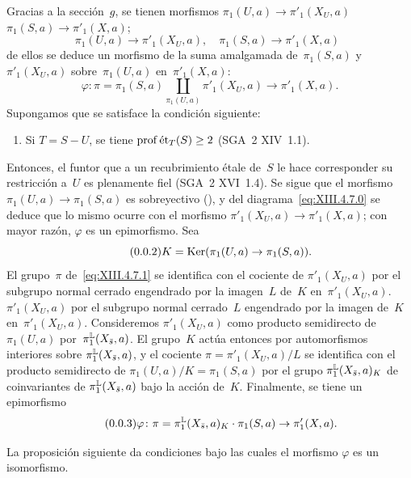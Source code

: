 Gracias a la sección~$g$, se tienen morfismos
{$\pi_1(U,a)\to\pi'_1(X_U,a)$ $\pi_1(S,a)\to\pi'_1(X,a)$;}
{$$\pi_1(U,a)\to\pi'_1(X_U,a),\quad \pi_1(S,a)\to\pi'_1(X,a)\,\;$$}
de ellos se deduce un morfismo de la suma amalgamada de~$\pi_1(S,a)$ y
$\pi'_1(X_U,a)$ sobre~$\pi_1(U,a)$ en~$\pi'_1(X,a)$:
\begin{equation*}
\label{eq:XIII.4.7.1} \tag{\thesubsection.1} {}
\varphi\colon\pi=\pi_1(S,a)\coprod_{\pi_1(U,a)}\pi'_1(X_U,a)\to\pi'_1(X,a).
\end{equation*}
Supongamos que se satisface la condición siguiente:
\begin{enumerate}
\item[c)] Si $T=S-U$, se tiene $\operatorname{prof} \mathrm{\acute{e}t}_T(S)\geq 2$ (SGA~2 XIV~1.1).
\end{enumerate}
Entonces, el funtor que a un recubrimiento étale de~$S$ le hace
corresponder su restricción a~$U$ es plenamente fiel (SGA~2 XVI~1.4).
Se sigue que el morfismo $\pi_1(U,a)\to\pi_1(S,a)$ es sobreyectivo
(), y del
diagrama~\eqref{eq:XIII.4.7.0} se deduce que lo mismo ocurre con el
morfismo $\pi'_1(X_U,a)\to\pi'_1(X,a)$; con mayor razón, $\varphi$ es un
epimorfismo. Sea
\begin{equation*}
\label{eq:XIII.4.7.2} \tag{\thesubsection.2} {}
K=\Ker(\pi_1(U,a)\to\pi_1(S,a)).
\end{equation*}
El grupo~$\pi$ de~\eqref{eq:XIII.4.7.1} se identifica con el cociente de
{$\pi'_1(X_U,a)$ por el subgrupo normal cerrado engendrado por la imagen~$L$
de~$K$ en~$\pi'_1(X_U,a)$.}
{$\pi'_1(X_U,a)$ por el subgrupo normal cerrado~$L$ engendrado por la imagen
de~$K$ en~$\pi'_1(X_U,a)$.}
Consideremos $\pi'_1(X_U,a)$ como producto
semidirecto de~$\pi_1(U,a)$ por~$\pi_1^\mathbb L (X_{\bar{s}},a)$. El grupo~$K$
actúa entonces por automorfismos interiores sobre
$\pi_1^\mathbb L (X_{\bar{s}},a)$, y el cociente
$\pi=\pi'_1(X_U,a)/L$ se identifica con el producto semidirecto de
$\pi_1(U,a)/K=\pi_1(S,a)$ por el grupo
$\pi_1^\mathbb L(X_{\bar{s}},a)_K$ de coinvariantes de
$\pi_1^{\mathbb L}(X_{\bar{s}},a)$ bajo la acción de~$K$. Finalmente, se tiene un
epimorfismo
\begin{equation*}
\label{eq:XIII.4.7.3} \tag{\thesubsection.3} {}
\varphi\colon\pi=\pi_1^\LL(X_{\bar{s}},a)_K\cdot\pi_1(S,a)\to\pi'_1(X,a).
\end{equation*}
\label{indnot:ml}%

La proposición siguiente da condiciones bajo las cuales el morfismo
$\varphi$ es un isomorfismo.

